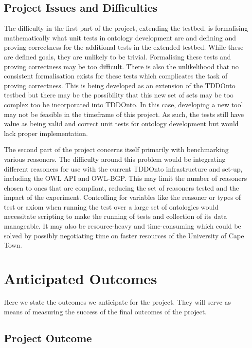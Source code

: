 \documentclass[draft]{sig-alternate}
\begin{document}
\subsection{Project Issues and Difficulties}

The difficulty in the first part of the project, extending the testbed, is formalising mathematically what unit tests in ontology development are and defining and proving correctness for the additional tests in the extended testbed. While these are defined goals, they are unlikely to be trivial. Formalising these tests and proving correctness may be too difficult. There is also the unlikelihood that no consistent formalisation exists for these tests which complicates the task of proving correctness. This is being developed as an extension of the TDDOnto testbed but there may be the possibility that this new set of sets may be too complex too be incorporated into TDDOnto. In this case, developing a new tool may not be feasible in the timeframe of this project. As such, the tests still have value as being valid and correct unit tests for ontology development but would lack proper implementation.

The second part of the project concerns itself primarily with benchmarking various reasoners. The difficulty around this problem would be integrating different reasoners for use with the current TDDOnto infrastructure and set-up, including the OWL API and OWL-BGP. This may limit the number of reasoners chosen to ones that are compliant, reducing the set of reasoners tested and the impact of the experiment. Controlling for variables like the reasoner or types of test or axiom when running the test over a large set of ontologies would necessitate scripting to make the running of tests and collection of its data manageable. It may also be resource-heavy and time-consuming which could be solved by possibly negotiating time on faster resources of the University of Cape Town.

\section{Anticipated Outcomes}

Here we state the outcomes we anticipate for the project. They will serve as means of measuring the success of the final outcomes of the project.

\subsection{Project Outcome}
\end{document}
